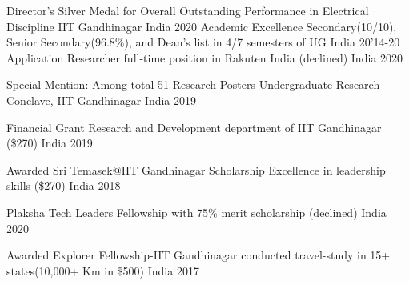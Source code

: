 \begin{cvhonors}


\cvhonor
    {Director's Silver Medal for Overall Outstanding Performance in Electrical Discipline} %
    { IIT Gandhinagar } %
    {India} %
    {2020} %
  \cvhonor
    {Academic Excellence} %
    {Secondary(10/10), Senior Secondary(96.8\%), and Dean's list in 4/7 semesters of UG} %
    {India} %
    {20'14-20} %
\cvhonor
    {Application Researcher} %
    {full-time position in Rakuten India (declined)} %
    {India} %
    {2020} %
    

  \cvhonor
    {Special Mention: Among total 51 Research Posters} %
    {Undergraduate Research Conclave, IIT Gandhinagar } %
    {India} %
    {2019} %
    
  \cvhonor
    {Financial Grant} %
    {Research and Development department of IIT Gandhinagar (\$270)} %
    {India} %
    {2019} %


  \cvhonor
    {Awarded Sri Temasek@IIT Gandhinagar Scholarship} %
    {Excellence in leadership skills (\$270)} %
    {India} %
    {2018} %

 \cvhonor
    {Plaksha Tech Leaders Fellowship} %
    {with 75\% merit scholarship (declined)} %
    {India} %
    {2020} %

 \cvhonor
    {Awarded Explorer Fellowship-IIT Gandhinagar} %
    {conducted travel-study in 15+ states(10,000+ Km in \$500)} %
    {India} %
    {2017} %


 
\end{cvhonors}

